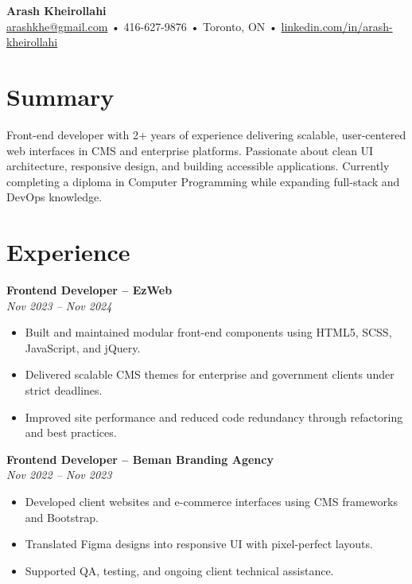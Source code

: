\documentclass[letterpaper,11pt]{article}
\begin{document}

{\LARGE \textbf{Arash Kheirollahi}}\\
\href{mailto:arashkhe@gmail.com}{arashkhe@gmail.com} • 416-627-9876 • Toronto, ON • \href{https://linkedin.com/in/arash-kheirollahi}{linkedin.com/in/arash-kheirollahi}

\vspace{1.2em}

\section*{Summary}
Front-end developer with 2+ years of experience delivering scalable, user-centered web interfaces in CMS and enterprise platforms. Passionate about clean UI architecture, responsive design, and building accessible applications. Currently completing a diploma in Computer Programming while expanding full-stack and DevOps knowledge.

\vspace{0.6em}

\section*{Experience}
\textbf{Frontend Developer – EzWeb}\\
\textit{Nov 2023 -- Nov 2024}\\
\begin{itemize}[leftmargin=*]
  \item Built and maintained modular front-end components using HTML5, SCSS, JavaScript, and jQuery.
  \item Delivered scalable CMS themes for enterprise and government clients under strict deadlines.
  \item Improved site performance and reduced code redundancy through refactoring and best practices.
\end{itemize}

\vspace{0.6em}

\textbf{Frontend Developer – Beman Branding Agency}\\
\textit{Nov 2022 -- Nov 2023}\\
\begin{itemize}[leftmargin=*]
  \item Developed client websites and e-commerce interfaces using CMS frameworks and Bootstrap.
  \item Translated Figma designs into responsive UI with pixel-perfect layouts.
  \item Supported QA, testing, and ongoing client technical assistance.
\end{itemize}
\end{document}
